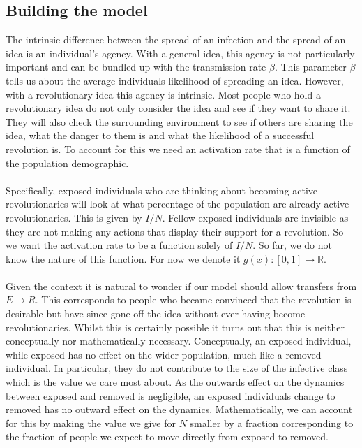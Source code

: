 \subsection{Building the model}
The intrinsic difference between the spread of an infection and the spread of an idea is an individual's agency. With a general idea, this agency is not particularly important and can be bundled up with the transmission rate $\beta$. This parameter $\beta$ tells us about the average individuals likelihood of spreading an idea. However, with a revolutionary idea this agency is intrinsic. Most people who hold a revolutionary idea do not only consider the idea and see if they want to share it. They will also check the surrounding environment to see if others are sharing the idea, what the danger to them is and what the likelihood of a successful revolution is. To account for this we need an activation rate that is a function of the population demographic.\\
\\
Specifically, exposed individuals who are thinking about becoming active revolutionaries will look at what percentage of the population are already active revolutionaries. This is given by $I/N$. Fellow exposed individuals are invisible as they are not making any actions that display their support for a revolution. So we want the activation rate to be a function solely of $I/N$. So far, we do not know the nature of this function. For now we denote it $g(x):[0,1]\rightarrow\mathbb{R}$.\\
\\
Given the context it is natural to wonder if our model should allow transfers from $E\rightarrow R$. This corresponds to people who became convinced that the revolution is desirable but have since gone off the idea without ever having become revolutionaries. Whilst this is certainly possible it turns out that this is neither conceptually nor mathematically necessary. Conceptually, an exposed individual, while exposed has no effect on the wider population, much like a removed individual. In particular, they do not contribute to the size of the infective class which is the value we care most about. As the outwards effect on the dynamics between exposed and removed is negligible, an exposed individuals change to removed has no outward effect on the dynamics. Mathematically, we can account for this by making the value we give for $N$ smaller by a fraction corresponding to the fraction of people we expect to move directly from exposed to removed.\label{mmd}
